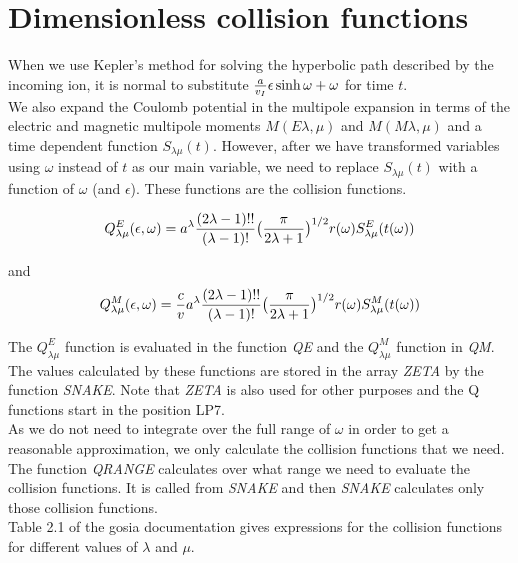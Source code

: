 \chapter{Dimensionless collision functions}
\label{chapt:collision}

When we use Kepler's method for solving the hyperbolic path described by the
incoming ion, it is normal to substitute ${a \over v_I} \epsilon\sinh\omega
+ \omega$ for time $t$.\\

We also expand the Coulomb potential in the multipole expansion in terms of
the electric and magnetic multipole moments $M(E\lambda,\mu)$ and
$M(M\lambda,\mu)$ and a time dependent function $S_{\lambda\mu}(t)$.
However, after we have transformed variables using $\omega$ instead of $t$
as our main variable, we need to replace $S_{\lambda\mu}(t)$ with a function
of $\omega$ (and $\epsilon$). These functions are the collision functions.

\begin{equation}
Q^E_{\lambda\mu}(\epsilon, \omega) =
a^\lambda
{(2\lambda-1)!! \over (\lambda-1)!}
\big({\pi \over 2\lambda+1}\big)^{1/2}
r(\omega)
S^E_{\lambda\mu}(t(\omega))
\end{equation}

and\\

\begin{equation}
Q^M_{\lambda\mu}(\epsilon, \omega) =
{c \over v}
a^\lambda
{(2\lambda-1)!! \over (\lambda-1)!}
\big({\pi \over 2\lambda+1}\big)^{1/2}
r(\omega)
S^M_{\lambda\mu}(t(\omega))
\end{equation}

The $Q^E_{\lambda\mu}$ function is evaluated in the function \emph{QE} and
the $Q^M_{\lambda\mu}$ function in \emph{QM}. The values calculated by these
functions are stored in the array \emph{ZETA} by the function \emph{SNAKE}.
Note that \emph{ZETA} is also used for other purposes and the Q functions
start in the position LP7.\\

As we do not need to integrate over the full range of $\omega$ in order to
get a reasonable approximation, we only calculate the collision functions
that we need. The function \emph{QRANGE} calculates over what range we need
to evaluate the collision functions. It is called from \emph{SNAKE} and then
\emph{SNAKE} calculates only those collision functions.\\

Table 2.1 of the gosia documentation gives expressions for the collision
functions for different values of $\lambda$ and $\mu$.

